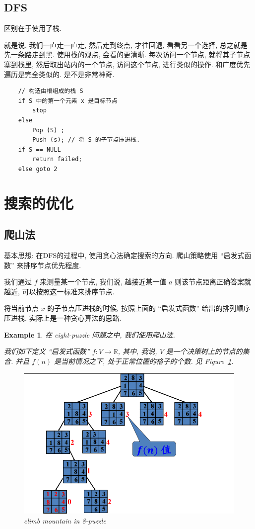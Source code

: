 \documentclass[a4paper, 10pt]{ctexart} %
\newtheorem{example}{Example}
\begin{document}
\subsection{DFS}
区别在于使用了栈.

就是说, 我们一直走一直走, 然后走到终点, 才往回退, 
看看另一个选择, 总之就是先一条路走到黑. 使用栈的观点, 
会看的更清晰. 每次访问一个节点, 就将其子节点塞到栈里, 
然后取出站内的一个节点, 访问这个节点, 进行类似的操作. 
和广度优先遍历是完全类似的. 是不是非常神奇.
\begin{verbatim}
    // 构造由根组成的栈 S
    if S 中的第一个元素 x 是目标节点
        stop
    else 
        Pop (S) ; 
        Push (s); // 将 S 的子节点压进栈.
    if S == NULL 
        return failed;
    else goto 2
\end{verbatim}
\section{搜索的优化}
\subsection{爬山法}
基本思想: 
在DFS的过程中, 使用贪心法确定搜索的方向. 
爬山策略使用 ``启发式函数'' 来排序节点优先程度. 

我们通过 $f$ 来测量某一个节点, 我们说, 
越接近某一值 $a$ 则该节点距离正确答案就越近, 
可以按照这一标准来排序节点. 

将当前节点 $x$ 的子节点压进栈的时候, 
按照上面的 ``启发式函数'' 给出的排列顺序压进栈.
实际上是一种贪心算法的思路. 

\begin{example}
    在 eight-puzzle 问题之中, 我们使用爬山法. 
    
    我们如下定义 ``启发式函数'' $f: V \to \mathbb{R}$, 其中, 我说, $V$ 是一个决策树上的节点的集合.
    并且 $f \left(n \right) $ 是当前情况之下, 处于正常位置的格子的个数. 见 Figure~\ref{tu5}.
    \begin{figure}
        \centering
        \includegraphics[scale = 0.5]{ss8.png}
        \caption{climb mountain in 8-puzzle}
        \label{tu5}
    \end{figure}
\end{example}
\end{document}
